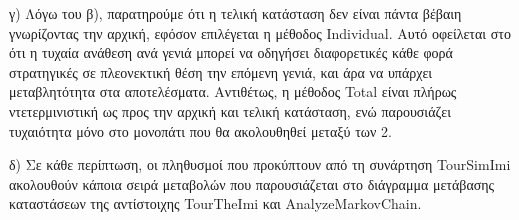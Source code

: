γ) Λόγω του β), παρατηρούμε ότι η τελική κατάσταση δεν είναι πάντα βέβαιη γνωρίζοντας την αρχική, εφόσον επιλέγεται η μέθοδος Individual. Αυτό οφείλεται στο ότι η τυχαία ανάθεση ανά γενιά μπορεί να οδηγήσει διαφορετικές κάθε φορά στρατηγικές σε πλεονεκτική θέση την επόμενη γενιά, και άρα να υπάρχει μεταβλητότητα στα αποτελέσματα. Αντιθέτως, η μέθοδος Total είναι πλήρως ντετερμινιστική ως προς την αρχική και τελική κατάσταση, ενώ παρουσιάζει τυχαιότητα μόνο στο μονοπάτι που θα ακολουθηθεί μεταξύ των 2.

δ) Σε κάθε περίπτωση, οι πληθυσμοί που προκύπτουν από τη συνάρτηση Tour\-Sim\-Imi ακολουθούν κάποια σειρά μεταβολών που παρουσιάζεται στο διάγραμμα μετάβασης καταστάσεων της αντίστοιχης Tour\-The\-Imi και Analyze\-Markov\-Chain.

